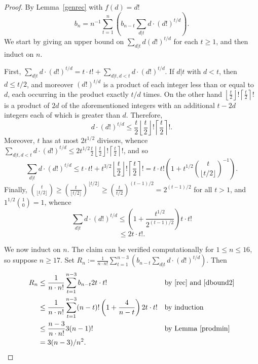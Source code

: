 \documentclass{daj}
\theoremstyle{plain}
\theoremstyle{definition}
\begin{document}
\begin{proof}
By Lemma~\ref{genrec} with $f(d)=d!$ \begin{equation}\label{rec}b_n=n^{-1}\sum_{t=1}^n\left( b_{n-t}\sum_{d|t}d\cdot (d!)^{t/d}\right).\end{equation} We start by giving an upper bound on $\sum_{d|t}d(d!)^{t/d}$ for each $t\geq 1$, and then induct on $n$.

First, $\sum_{d|t}d\cdot (d!)^{t/d}=t\cdot t!+\sum_{d|t,d<t}d\cdot (d!)^{t/d}$. If $d|t$ with $d<t$, then $d\leq t/2$, and moreover $(d!)^{t/d}$ is a product of each integer less than or equal to $d$, each occurring in the product exactly $t/d$ times. On the other hand $\left\lfloor\frac{t}{2}\right\rfloor!\left\lceil\frac{t}{2}\right\rceil!$ is a product of $2d$ of the aforementioned integers with an additional $t-2d$ integers each of which is greater than $d$. Therefore, $$d\cdot(d!)^{t/d}\leq \frac{t}{2}\left\lfloor\frac{t}{2}\right\rfloor!\left\lceil\frac{t}{2}\right\rceil!.$$
Moreover, $t$ has at most $2t^{1/2}$ divisors, whence $\sum_{d|t,d<t}d\cdot (d!)^{t/d}\leq 2t^{1/2}\frac{t}{2}\left\lfloor\frac{t}{2}\right\rfloor!\left\lceil\frac{t}{2}\right\rceil!$, and so $$\sum_{d|t}d\cdot (d!)^{t/d}\leq t\cdot t!+t^{3/2}\left\lfloor\frac{t}{2}\right\rfloor!\left\lceil\frac{t}{2}\right\rceil!= t\cdot t!\left(1+t^{1/2}{t\choose \lfloor t/2\rfloor}^{-1}\right).$$ Finally, ${t\choose \lfloor t/2\rfloor}\geq\left(\frac{t}{\lfloor t/2\rfloor}\right)^{\lfloor t/2\rfloor}\geq\left(\frac{t}{t/2}\right)^{(t-1)/2}=2^{(t-1)/2}$ for all $t>1$, and $1^{1/2}{1\choose 0}=1$, whence \begin{equation}\label{dbound}\sum_{d|t}d\cdot (d!)^{t/d}\leq \left(1+\frac{t^{1/2}}{2^{(t-1)/2}}\right)t\cdot t!\end{equation}\begin{equation}\label{dbound2}\leq 2t\cdot t!.\end{equation}

We now induct on $n$. The claim can be verified computationally for $1\leq n\leq 16$, so suppose $n\geq 17$. Set $R_n:=\frac{1}{n\cdot n!}\sum_{t=1}^{n-3}\left(b_{n-t}\sum_{d|t}d\cdot (d!)^{t/d}\right)$. Then 
\begin{align*}R_n&\leq \frac{1}{n\cdot n!}\sum_{t=1}^{n-3}b_{n-t} 2t\cdot t!&&\text{by~\eqref{rec} and~\eqref{dbound2}}\\&\leq\frac{1}{n\cdot n!}\sum_{t=1}^{n-3}(n-t)!\left(1+\frac{4}{n-t}\right)2t\cdot t!&&\text{by induction}\\&\leq \frac{n-3}{n\cdot n!}3(n-1)!&&\text{by Lemma~\ref{prodmin}}\\&=3(n-3)/n^2.\end{align*}
 

\end{proof}
\end{document}
